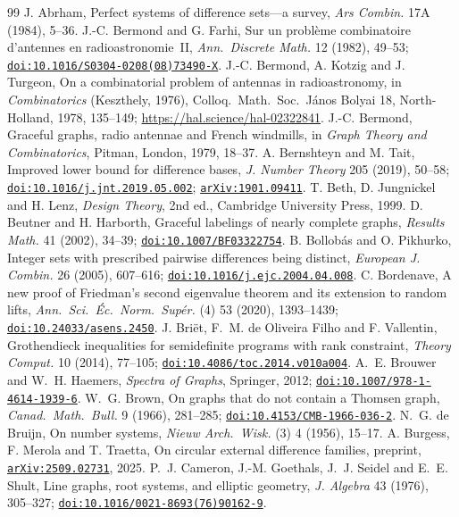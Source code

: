 \documentclass[11pt]{amsart}
\theoremstyle{tplain}
\theoremstyle{tdefinition}
\theoremstyle{tremark}
\newcommand{\doi}[1]{\href{https://doi.org/#1}{\nolinkurl{doi:#1}}}
\newcommand{\arxiv}[1]{\href{https://arxiv.org/abs/#1}{\nolinkurl{arXiv:#1}}}
\begin{document}
\begin{thebibliography}{99}\small
\setlength{\itemsep}{0.1em}
J. Abrham, Perfect systems of difference sets---a survey, \emph{Ars Combin.}
17A (1984), 5--36.
J.-C. Bermond and G. Farhi, Sur un probl\`eme combinatoire d'antennes en
radioastronomie~II, \emph{Ann.\ Discrete Math.} 12 (1982), 49--53; \doi{10.1016/S0304-0208(08)73490-X}.
J.-C. Bermond, A. Kotzig and J. Turgeon, On a combinatorial problem of
antennas in radioastronomy, in \emph{Combinatorics} (Keszthely, 1976),
Colloq.\ Math.\ Soc.\ J\'anos Bolyai 18, North-Holland, 1978, 135--149; \url{https://hal.science/hal-02322841}.
J.-C. Bermond, Graceful graphs, radio antennae and French windmills, in
\emph{Graph Theory and Combinatorics}, Pitman, London, 1979, 18--37.
A. Bernshteyn and M. Tait, Improved lower bound for difference bases,
\emph{J. Number Theory} 205 (2019), 50--58; \doi{10.1016/j.jnt.2019.05.002}; \arxiv{1901.09411}.
T. Beth, D. Jungnickel and H. Lenz, \emph{Design Theory}, 2nd ed., Cambridge
University Press, 1999.
D. Beutner and H. Harborth, Graceful labelings of nearly complete graphs,
\emph{Results Math.} 41 (2002), 34--39; \doi{10.1007/BF03322754}.
B. Bollob\'as and O. Pikhurko, Integer sets with prescribed pairwise
differences being distinct, \emph{European J. Combin.} 26 (2005), 607--616; \doi{10.1016/j.ejc.2004.04.008}.
C. Bordenave, A new proof of Friedman's second eigenvalue theorem and its
extension to random lifts, \emph{Ann.\ Sci.\ \'Ec.\ Norm.\ Sup\'er.} (4) 53
(2020), 1393--1439; \doi{10.24033/asens.2450}.
J. Bri\"et, F.~M. de Oliveira Filho and F. Vallentin, Grothendieck
inequalities for semidefinite programs with rank constraint, \emph{Theory
Comput.} 10 (2014), 77--105; \doi{10.4086/toc.2014.v010a004}.
A.~E. Brouwer and W.~H. Haemers, \emph{Spectra of Graphs}, Springer, 2012; \doi{10.1007/978-1-4614-1939-6}.
W.~G. Brown, On graphs that do not contain a Thomsen graph, \emph{Canad.\
Math.\ Bull.} 9 (1966), 281--285; \doi{10.4153/CMB-1966-036-2}.
N.~G. de Bruijn, On number systems, \emph{Nieuw Arch.\ Wisk.} (3) 4 (1956), 15--17.
\bibitem{bmt}
A. Burgess, F. Merola and T. Traetta, On circular external difference
families, preprint, \arxiv{2509.02731}, 2025.
P.~J. Cameron, J.-M. Goethals, J.~J. Seidel and E.~E. Shult, Line graphs, root
systems, and elliptic geometry, \emph{J. Algebra} 43 (1976), 305--327; \doi{10.1016/0021-8693(76)90162-9}.

\end{thebibliography}
\end{document}
